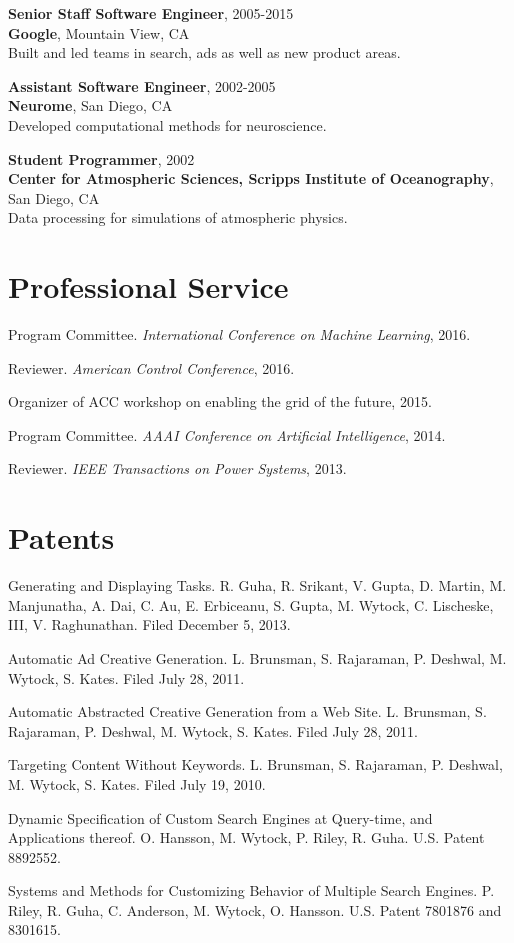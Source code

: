 \documentclass[margin, line]{res}
\begin{document}
\begin{resume}
{\bf Senior Staff Software Engineer}, 2005-2015 \\
{\bf Google}, Mountain View, CA \\
Built and led teams in search, ads as well as new product areas.

{\bf Assistant Software Engineer}, 2002-2005 \\
{\bf Neurome}, San Diego, CA \\
Developed computational methods for neuroscience.

{\bf Student Programmer}, 2002 \\
{\bf Center for Atmospheric Sciences, Scripps Institute of Oceanography}, San
Diego, CA \\
Data processing for simulations of atmospheric physics.


\section{Professional Service}

Program Committee. \emph{International Conference on Machine Learning}, 2016.

Reviewer. \emph{American Control Conference}, 2016.

Organizer of ACC workshop on enabling the grid of the future, 2015.

Program Committee. \emph{AAAI Conference on Artificial Intelligence}, 2014.

Reviewer. \emph{IEEE Transactions on Power Systems}, 2013.

\section{Patents}

Generating and Displaying Tasks. R. Guha, R. Srikant, V. Gupta, D. Martin,
M. Manjunatha, A. Dai, C. Au,  E. Erbiceanu, S. Gupta, M. Wytock, C. Lischeske,
III, V. Raghunathan. Filed December 5, 2013.

Automatic Ad Creative Generation. L. Brunsman, S. Rajaraman, P. Deshwal,
M. Wytock, S. Kates. Filed July 28, 2011.

Automatic Abstracted Creative Generation from a Web Site. L. Brunsman,
S. Rajaraman, P. Deshwal, M. Wytock, S. Kates. Filed July 28, 2011.

Targeting Content Without Keywords. L. Brunsman, S. Rajaraman, P. Deshwal,
M. Wytock, S. Kates. Filed July 19, 2010.

Dynamic Specification of Custom Search Engines at Query-time, and Applications
thereof. O. Hansson, M. Wytock, P. Riley, R. Guha. U.S. Patent 8892552.

Systems and Methods for Customizing Behavior of Multiple Search
Engines. P. Riley, R. Guha, C. Anderson, M. Wytock, O. Hansson. U.S. Patent 7801876 and 8301615.

\end{resume}
\end{document}
